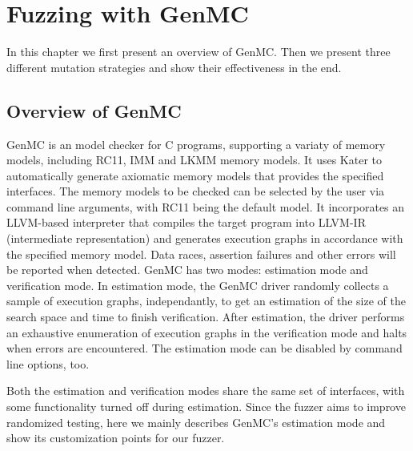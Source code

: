 \chapter{\label{cha:genmc}Fuzzing with GenMC}

In this chapter we first present an overview of GenMC. Then we present three different mutation strategies and show their effectiveness in the end.

\section{Overview of GenMC}

GenMC is an model checker for C programs, supporting a variaty of memory models, including RC11\cite{RC11}, IMM\cite{IMM} and LKMM\cite{LKMM} memory models. It uses Kater\cite{Kater} to automatically generate axiomatic memory models that provides the specified interfaces. The memory models to be checked can be selected by the user via command line arguments, with RC11 being the default model. It incorporates an LLVM-based interpreter that compiles the target program into LLVM-IR (intermediate representation) and generates execution graphs in accordance with the specified memory model. Data races, assertion failures and other errors will be reported when detected. GenMC has two modes: estimation mode and verification mode. In estimation mode, the GenMC driver randomly collects a sample of execution graphs, independantly, to get an estimation of the size of the search space and time to finish verification. After estimation, the driver performs an exhaustive enumeration of execution graphs in the verification mode and halts when errors are encountered. The estimation mode can be disabled by command line options, too.

Both the estimation and verification modes share the same set of interfaces, with some functionality turned off during estimation. Since the fuzzer aims to improve randomized testing, here we mainly describes GenMC's estimation mode and show its customization points for our fuzzer.

